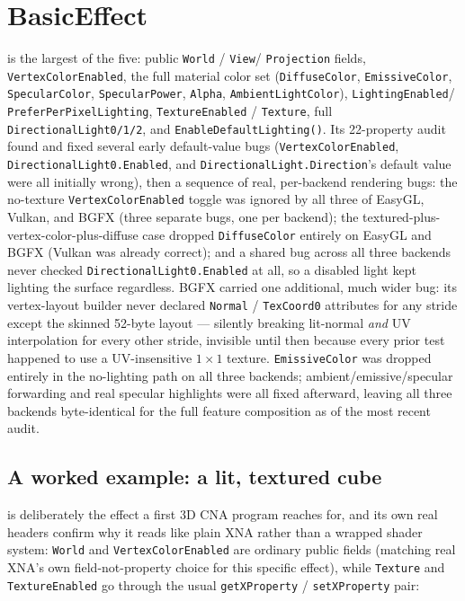 \section{BasicEffect}

 is the largest of the five: public \texttt{World} / \texttt{View}/%
\texttt{Projection} fields, \texttt{VertexColorEnabled}, the full material color set
(\texttt{DiffuseColor}, \texttt{EmissiveColor}, \texttt{SpecularColor}, \texttt{SpecularPower},
\texttt{Alpha}, \texttt{AmbientLightColor}), \texttt{LightingEnabled}/%
\texttt{PreferPerPixelLighting}, \texttt{TextureEnabled} / \texttt{Texture}, full
\texttt{DirectionalLight0/1/2}, and \texttt{EnableDefaultLighting()}. Its 22-property audit
found and fixed several early default-value bugs (\texttt{VertexColorEnabled},
\texttt{DirectionalLight0.Enabled}, and \texttt{DirectionalLight.Direction}'s default value
were all initially wrong), then a sequence of real, per-backend rendering bugs: the
no-texture \texttt{VertexColorEnabled} toggle was ignored by all three of EasyGL, Vulkan, and
BGFX (three separate bugs, one per backend); the textured-plus-vertex-color-plus-diffuse case
dropped \texttt{DiffuseColor} entirely on EasyGL and BGFX (Vulkan was already correct); and a
shared bug across all three backends never checked \texttt{DirectionalLight0.Enabled} at all,
so a disabled light kept lighting the surface regardless. BGFX carried one additional,
much wider bug: its vertex-layout builder never declared \texttt{Normal} / \texttt{TexCoord0}
attributes for any stride except the skinned 52-byte layout --- silently breaking lit-normal
\emph{and} UV interpolation for every other stride, invisible until then because every prior
test happened to use a UV-insensitive $1\times1$ texture. \texttt{EmissiveColor} was dropped
entirely in the no-lighting path on all three backends; ambient/emissive/specular forwarding
and real specular highlights were all fixed afterward, leaving all three backends
byte-identical for the full feature composition as of the most recent audit.

\subsection{A worked example: a lit, textured cube}

 is deliberately the effect a first 3D CNA program reaches for, and its
own real headers confirm why it reads like plain XNA rather than a wrapped shader system:
\texttt{World} and \texttt{VertexColorEnabled} are ordinary public fields (matching real XNA's
own field-not-property choice for this specific effect), while \texttt{Texture} and
\texttt{TextureEnabled} go through the usual \texttt{getXProperty} / \texttt{setXProperty} pair:

